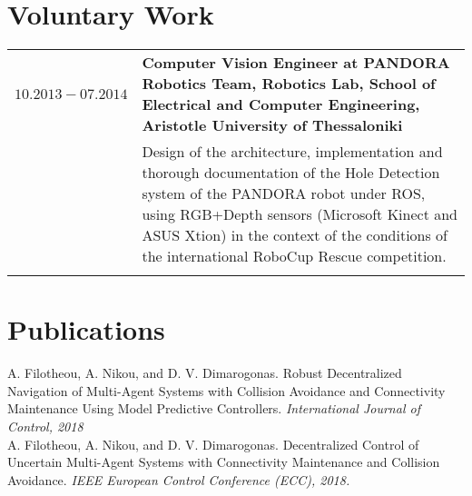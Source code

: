 \documentclass[a4paper,10pt,twoside]{article}
\begin{document}
\section{Voluntary Work}


\begin{tabular}{rp{11cm}}
$10.2013 -07.2014$ & \textbf{Computer Vision Engineer at PANDORA Robotics Team, Robotics Lab,
School of Electrical and Computer Engineering, Aristotle University of Thessaloniki} \\
& \small{Design of the architecture, implementation and thorough documentation of
the Hole Detection system of the PANDORA robot under ROS, using RGB+Depth sensors
(Microsoft Kinect and ASUS Xtion) in the context of the conditions of the international
RoboCup Rescue competition.}\\
\multicolumn{2}{c}{} \\
\end{tabular}


\section{Publications}

A. Filotheou, A. Nikou, and D. V. Dimarogonas. Robust Decentralized Navigation
of Multi-Agent Systems with Collision Avoidance and Connectivity Maintenance
Using Model Predictive Controllers. \textit{International Journal of Control, 2018}\\

A. Filotheou, A. Nikou, and D. V. Dimarogonas. Decentralized Control of Uncertain
Multi-Agent Systems with Connectivity Maintenance and Collision Avoidance.
\textit{IEEE European Control Conference (ECC), 2018.}\\




\end{document}
